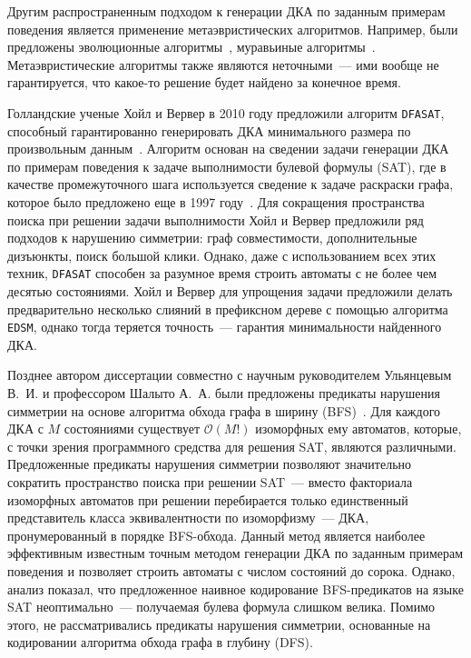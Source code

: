 Другим распространенным подходом к генерации ДКА по заданным примерам поведения является применение метаэвристических алгоритмов.
Например, были предложены эволюционные алгоритмы~\cite{DBLP:journals/pami/LucasR05,DBLP:conf/cec/Gomez06}, муравьиные алгоритмы~\cite{chivilikhin-12-ant}.
Метаэвристические алгоритмы также являются неточными~--- ими вообще не гарантируется, что какое-то решение будет найдено за конечное время.

Голландские ученые Хойл и Вервер в 2010 году предложили алгоритм \texttt{DFASAT}, способный гарантированно генерировать ДКА минимального размера по произвольным данным~\cite{heule-icgi10}.
Алгоритм основан на сведении задачи генерации ДКА по примерам поведения к задаче выполнимости булевой формулы (SAT), где в качестве промежуточного шага используется сведение к задаче раскраски графа, которое было предложено еще в 1997 году~\cite{Coste97regularinference}.
Для сокращения пространства поиска при решении задачи выполнимости Хойл и Вервер предложили ряд подходов к нарушению симметрии: граф совместимости, дополнительные дизъюнкты, поиск большой клики.
Однако, даже с использованием всех этих техник, \texttt{DFASAT} способен за разумное время строить автоматы с не более чем десятью состояниями.
Хойл и Вервер для упрощения задачи предложили делать предварительно несколько слияний в префиксном дереве с помощью алгоритма \texttt{EDSM}, однако тогда теряется точность~--- гарантия минимальности найденного ДКА.

Позднее автором диссертации совместно с научным руководителем Ульянцевым В.~И. и профессором Шалыто А.~А. были предложены предикаты нарушения симметрии на основе алгоритма обхода графа в ширину (BFS)~\cite{zakirzyanov2015LATA}.
Для каждого ДКА с $M$ состояниями существует $\mathcal{O}\left(M!\right)$ изоморфных ему автоматов, которые, с точки зрения программного средства для решения SAT, являются различными.
Предложенные предикаты нарушения симметрии позволяют значительно сократить пространство поиска при решении SAT~--- вместо факториала изоморфных автоматов при решении перебирается только единственный представитель класса эквивалентности по изоморфизму~--- ДКА, пронумерованный в порядке BFS-обхода.
Данный метод является наиболее эффективным известным точным методом генерации ДКА по заданным примерам поведения и позволяет строить автоматы с числом состояний до сорока.
Однако, анализ показал, что предложенное наивное кодирование BFS-предикатов на языке SAT неоптимально~--- получаемая булева формула слишком велика.
Помимо этого, не рассматривались предикаты нарушения симметрии, основанные на кодировании алгоритма обхода графа в глубину (DFS).

